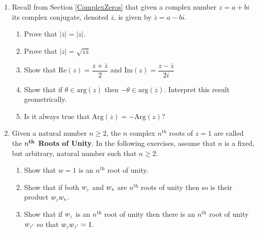 \documentclass{ximera}
\begin{document}
\begin{enumerate}
\item Recall from Section \ref{ComplexZeros} that given a complex number $z = a+bi$ its complex conjugate, denoted $\overline{z}$, is given by $\overline{z} = a - bi$.

\begin{enumerate}

\item Prove that $\left| \overline{z} \right| = |z|$.

\item Prove that $|z| = \sqrt{z \overline{z}}$

\item Show that $\text{Re}(z) = \dfrac{z + \overline{z}}{2}$ and $\text{Im}(z) = \dfrac{z - \overline{z}}{2i}$

\item Show that if $\theta \in \text{arg}(z)$ then $-\theta \in \text{arg}\left(\overline{z}\right)$. Interpret this result geometrically.

\item Is it always true that $\text{Arg}\left(\overline{z}\right) = -\text{Arg}(z)$?

\end{enumerate}

\item Given a natural number $n \geq 2$, the $n$ complex $n^{\text{th}}$ roots of  $z = 1$ are called the \textbf{\boldmath $n^{\mbox{\textbf{\scriptsize th}}}$ Roots of Unity}.    In the following exercises, assume that $n$ is a fixed, but arbitrary, natural number such that $n \geq 2$.

\begin{enumerate}

\item Show that $w = 1$ is an $n^{\text{th}}$ root of unity.

\item Show that if both $w_{\text{\tiny$j$}}$ and $w_{\text{\tiny$k$}}$ are $n^{\text{th}}$ roots of unity then so is their product $w_{\text{\tiny$j$}}w_{\text{\tiny$k$}}$.

\item Show that if $w_{\text{\tiny$j$}}$ is an $n^{\text{th}}$ root of unity then there is an $n^{\text{th}}$ root of unity $w_{\text{\tiny$j'$}}$  so that  $w_{\text{\tiny$j$}}w_{\text{\tiny$j'$}} = 1$. 

\smallskip


\end{enumerate}
\end{enumerate}
\end{document}
